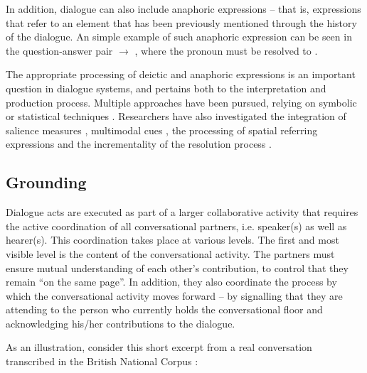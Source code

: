 In addition, dialogue can also include anaphoric expressions -- that is, expressions that refer to an element that has been previously mentioned through the history of the dialogue. An simple example of such anaphoric expression can be seen in the question-answer pair  $\rightarrow$ , where the pronoun  must be resolved to . 

The appropriate processing of deictic and anaphoric expressions is an important question in dialogue systems, and pertains both to the interpretation and production process. Multiple approaches have been pursued, relying on symbolic \citep{Eckert2000} or statistical techniques \citep{StrubeM03,Stent2010}.  Researchers have also investigated the integration of salience measures \citep{Kelleher:2004}, multimodal cues \citep{Frampton:2009,Chen:2011}, the processing of spatial referring expressions \citep{zender/etal:2009-ijcai} and the incrementality of the resolution process \citep{schlangen2009incremental,poesio2011incremental}. 

\subsection{Grounding}

Dialogue acts are executed as part of a larger collaborative activity that requires the active coordination of all conversational partners, i.e. speaker(s) as well as hearer(s).  This coordination takes place at various levels.  The first and most visible level is the content of the conversational activity.   The partners must ensure mutual understanding of each other's contribution, to control that they remain ``on the same page''.  In addition, they  also coordinate the process by which the conversational activity moves forward -- by signalling that they are attending to the person who currently holds the conversational floor and acknowledging his/her contributions to the dialogue.

As an illustration, consider this short excerpt from a real conversation transcribed in the British National Corpus \citep{bnc} :

